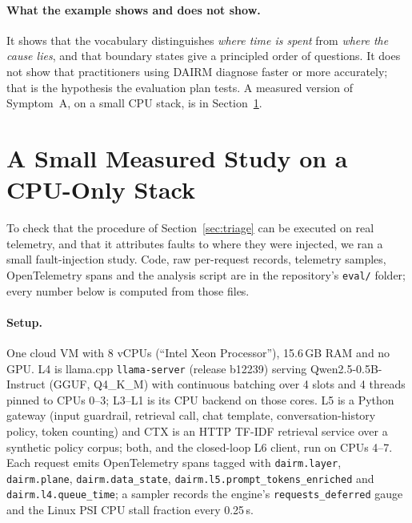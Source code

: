 \documentclass[11pt]{article}
\begin{document}
\paragraph{What the example shows and does not show.} It shows that the vocabulary distinguishes \emph{where time is spent} from \emph{where the cause lies}, and that boundary states give a principled order of questions. It does not show that practitioners using DAIRM diagnose faster or more accurately; that is the hypothesis the evaluation plan tests. A measured version of Symptom~A, on a small CPU stack, is in Section~\ref{sec:study}.

\section{A Small Measured Study on a CPU-Only Stack}
\label{sec:study}

To check that the procedure of Section~\ref{sec:triage} can be executed on real telemetry, and that it attributes faults to where they were injected, we ran a small fault-injection study. Code, raw per-request records, telemetry samples, OpenTelemetry spans and the analysis script are in the repository's \texttt{eval/} folder; every number below is computed from those files.

\paragraph{Setup.} One cloud VM with 8 vCPUs (``Intel Xeon Processor''), 15.6\,GB RAM and no GPU. L4 is llama.cpp \texttt{llama-server} (release b12239) serving Qwen2.5-0.5B-Instruct (GGUF, Q4\_K\_M) with continuous batching over 4 slots and 4 threads pinned to CPUs 0--3; L3--L1 is its CPU backend on those cores. L5 is a Python gateway (input guardrail, retrieval call, chat template, conversation-history policy, token counting) and CTX is an HTTP TF-IDF retrieval service over a synthetic policy corpus; both, and the closed-loop L6 client, run on CPUs 4--7. Each request emits OpenTelemetry spans tagged with \texttt{dairm.layer}, \texttt{dairm.plane}, \texttt{dairm.data\_state}, \texttt{dairm.l5.prompt\_tokens\_enriched} and \texttt{dairm.l4.queue\_time}; a sampler records the engine's \texttt{requests\_deferred} gauge and the Linux PSI CPU stall fraction every 0.25\,s.
\end{document}
